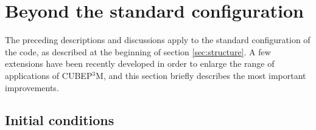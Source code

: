 \documentclass[useAMS,usenatbib]{mn2e}
\begin{document}
%




%

\section{Beyond the standard configuration}
\label{sec:extensions}

The preceding descriptions and discussions apply to the standard configuration of the code, 
as described at the beginning of section \ref{sec:structure}. A few extensions have been recently developed
in order to enlarge the range of applications of {\small CUBEP$^3$M}, and this section briefly 
describes the most important improvements.

\subsection{Initial conditions}
\label{subsec:init}
\end{document}
